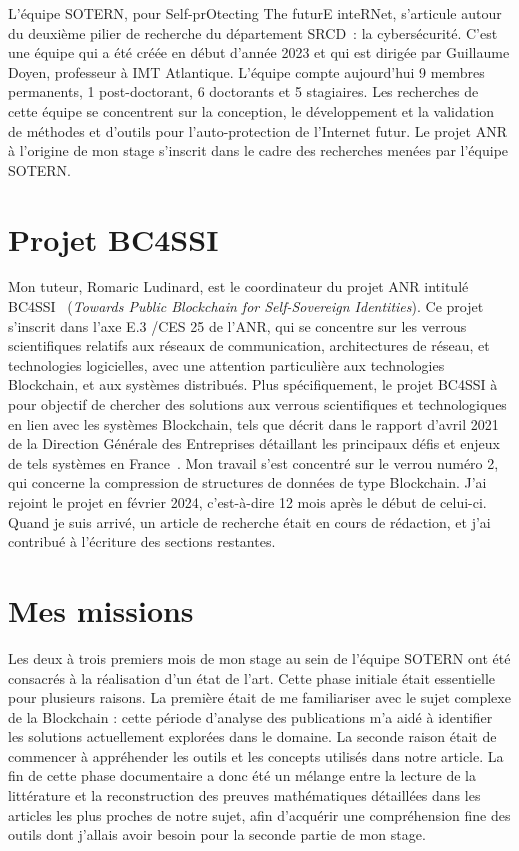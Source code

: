     L'équipe SOTERN, pour Self-prOtecting The futurE inteRNet, s'articule autour
    du deuxième pilier de recherche du département SRCD~: la cybersécurité.
    C'est une équipe qui a été créée en début d'année 2023 et qui est dirigée
    par Guillaume Doyen, professeur à IMT Atlantique. L'équipe compte
    aujourd'hui 9 membres permanents, 1 post-doctorant, 6 doctorants et 5
    stagiaires. Les recherches de cette équipe se concentrent sur la conception,
    le développement et la validation de méthodes et d'outils pour
    l'auto-protection de l'Internet futur. Le projet ANR à l'origine de mon stage
    s'inscrit dans le cadre des recherches menées par l'équipe SOTERN.


\section{Projet BC4SSI}\label{sec:bc4ssi} 

    Mon tuteur, Romaric Ludinard, est le coordinateur du projet ANR intitulé
    BC4SSI~\cite{anr} (\textit{Towards Public Blockchain for Self-Sovereign
    Identities}). Ce projet s'inscrit dans l'axe E.3 /CES 25 de l'ANR, qui se
    concentre sur les verrous scientifiques relatifs aux réseaux de
    communication, architectures de réseau, et technologies logicielles, avec
    une attention particulière aux technologies Blockchain, et aux systèmes
    distribués. Plus spécifiquement, le projet BC4SSI à pour objectif de chercher
    des solutions aux verrous scientifiques et technologiques en lien avec les
    systèmes Blockchain, tels que décrit dans le rapport d'avril 2021 de la
    Direction Générale des Entreprises détaillant les principaux défis et enjeux
    de tels systèmes en France~\cite{dge}. Mon travail s'est concentré sur le
    verrou numéro 2, qui concerne la compression de structures de données de
    type Blockchain. J'ai rejoint le projet en février 2024, c'est-à-dire 12
    mois après le début de celui-ci. Quand je suis arrivé, un article de recherche
    était en cours de rédaction, et j'ai contribué à l'écriture des sections
    restantes.


\section{Mes missions}\label{sec:mes_missions}

    Les deux à trois premiers mois de mon stage au sein de l'équipe SOTERN ont
    été consacrés à la réalisation d'un état de l'art. Cette phase initiale
    était essentielle pour plusieurs raisons. La première était de me
    familiariser avec le sujet complexe de la Blockchain : cette période
    d'analyse des publications m'a aidé à identifier les solutions actuellement
    explorées dans le domaine. La seconde raison était de commencer à
    appréhender les outils et les concepts utilisés dans notre article. La fin
    de cette phase documentaire a donc été un mélange entre la lecture de la
    littérature et la reconstruction des preuves mathématiques détaillées dans
    les articles les plus proches de notre sujet, afin d'acquérir une
    compréhension fine des outils dont j'allais avoir besoin pour la seconde
    partie de mon stage.


